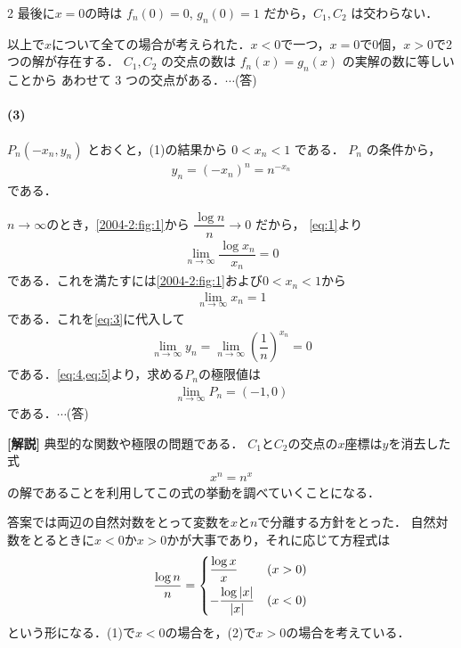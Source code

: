 \documentclass[../../main.tex]{subfiles}
\begin{document}
\begin{multicols}{2}
  最後に$x=0$の時は $f_n(0) = 0$, $g_n(0) = 1$ だから，$C_1, C_2$ は交わらない．

  以上で$x$について全ての場合が考えられた．$x<0$で一つ，$x=0$で0個，$x>0$で2つの解が存在する．
  $C_1, C_2$ の交点の数は $f_n(x) = g_n(x)$ の実解の数に等しいことから
  あわせて $3$ つの交点がある．$\cdots$(答)

  \paragraph{(3)}

  $P_n(-x_n, y_n)$ とおくと，(1)の結果から $0 < x_n < 1$ である．
  $P_n$ の条件から，
  \begin{align}
    y_n = (-x_n)^n = n^{-x_n} \label{eq:3}
  \end{align}
  である．

  $n\to\infty$のとき，\cref{2004-2:fig:1}から $\dfrac{\log n}{n} \to 0$ だから，
  \cref{eq:1}より
  \begin{align}
    \lim_{n\to\infty} \dfrac{\log x_n}{x_n} = 0
  \end{align}
  である．これを満たすには\cref{2004-2:fig:1}および$0<x_n<1$から
  \begin{align}
    \lim_{n\to\infty} x_n = 1 \label{eq:4}
  \end{align}
  である．これを\cref{eq:3}に代入して
  \begin{align}
    \lim_{n\to\infty} y_n = \lim_{n\to\infty} \left(\dfrac{1}{n}\right)^{x_n} = 0 \label{eq:5}
  \end{align}
  である．\cref{eq:4,eq:5}より，求める$P_n$の極限値は
  \begin{align}
    \lim_{n\to\infty}P_n = (-1,0)
  \end{align}
  である．$\cdots$(答)

  {\bf [解説]}
  典型的な関数や極限の問題である．
  $C_1$と$C_2$の交点の$x$座標は$y$を消去した式
  \begin{align}
    x^{n} = n^{x}
  \end{align}
  の解であることを利用してこの式の挙動を調べていくことになる．

  答案では両辺の自然対数をとって変数を$x$と$n$で分離する方針をとった．
  自然対数をとるときに$x<0$か$x>0$かが大事であり，それに応じて方程式は
  \begin{align}
    \dfrac{\log n}{n} =
    \begin{dcases}
      \dfrac{\log x}{x}      & (x>0) \\
      -\dfrac{\log |x|}{|x|} & (x<0)
    \end{dcases}
  \end{align}
  という形になる．(1)で$x<0$の場合を，(2)で$x>0$の場合を考えている．


\end{multicols}
\end{document}
